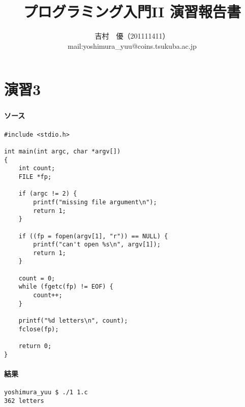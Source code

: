 \documentclass[11pt,a4paper,a4j]{jsarticle}
\title{プログラミング入門II 演習報告書}
\author{吉村　優（201111411）\\
mail:yoshimura\_yuu@coins.tsukuba.ac.jp}
\begin{document}
\maketitle

\part*{演習3}
\section{}
\subsection{ソース}
\begin{shadebox}
\begin{verbatim}
#include <stdio.h>

int main(int argc, char *argv[])
{
    int count;
    FILE *fp;

    if (argc != 2) {
        printf("missing file argument\n");
        return 1;
    }

    if ((fp = fopen(argv[1], "r")) == NULL) {
        printf("can't open %s\n", argv[1]);
        return 1;
    }

    count = 0;
    while (fgetc(fp) != EOF) {
        count++;
    }

    printf("%d letters\n", count);
    fclose(fp);

    return 0;
}
\end{verbatim}
\end{shadebox}

\subsection{結果}
\begin{shadebox}
\begin{verbatim}
yoshimura_yuu $ ./1 1.c
362 letters
\end{verbatim}
\end{shadebox}

\section{}
\end{document}
